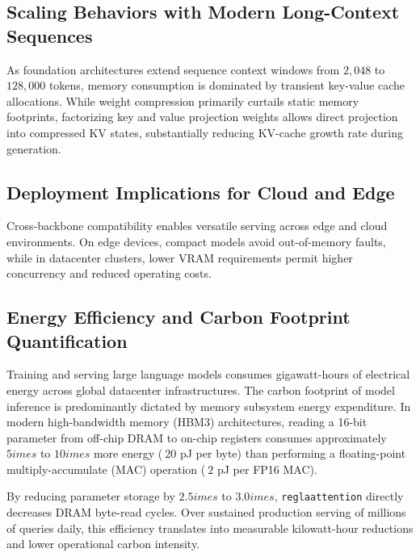 \subsection{Scaling Behaviors with Modern Long-Context Sequences}
As foundation architectures extend sequence context windows from $2{,}048$ to $128{,}000$ tokens, memory consumption is dominated by transient key-value cache allocations. While weight compression primarily curtails static memory footprints, factorizing key and value projection weights allows direct projection into compressed KV states, substantially reducing KV-cache growth rate during generation.

\subsection{Deployment Implications for Cloud and Edge}
Cross-backbone compatibility enables versatile serving across edge and cloud environments. On edge devices, compact models avoid out-of-memory faults, while in datacenter clusters, lower VRAM requirements permit higher concurrency and reduced operating costs.

\subsection{Energy Efficiency and Carbon Footprint Quantification}
Training and serving large language models consumes gigawatt-hours of electrical energy across global datacenter infrastructures. The carbon footprint of model inference is predominantly dictated by memory subsystem energy expenditure. In modern high-bandwidth memory (HBM3) architectures, reading a 16-bit parameter from off-chip DRAM to on-chip registers consumes approximately $5	imes$ to $10	imes$ more energy ($~20$ pJ per byte) than performing a floating-point multiply-accumulate (MAC) operation ($~2$ pJ per FP16 MAC).

By reducing parameter storage by $2.5	imes$ to $3.0	imes$, \texttt{reglaattention} directly decreases DRAM byte-read cycles. Over sustained production serving of millions of queries daily, this efficiency translates into measurable kilowatt-hour reductions and lower operational carbon intensity.
